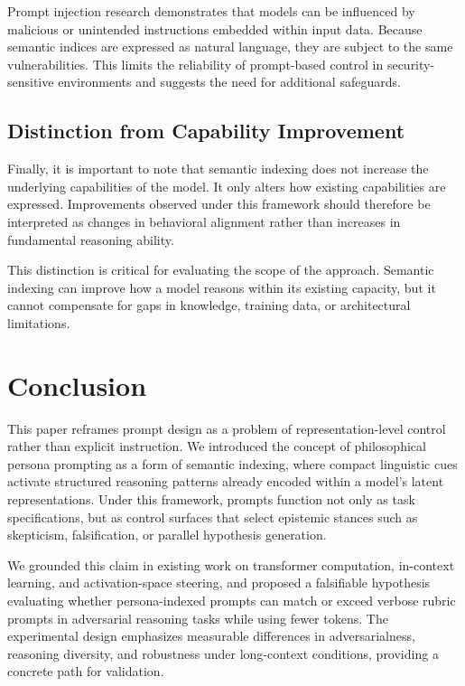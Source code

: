 \documentclass[11pt]{article}
\begin{document}
Prompt injection research demonstrates that models can be influenced by malicious or unintended instructions embedded within input data. Because semantic indices are expressed as natural language, they are subject to the same vulnerabilities. This limits the reliability of prompt-based control in security-sensitive environments and suggests the need for additional safeguards.

\subsection{Distinction from Capability Improvement}

Finally, it is important to note that semantic indexing does not increase the underlying capabilities of the model. It only alters how existing capabilities are expressed. Improvements observed under this framework should therefore be interpreted as changes in behavioral alignment rather than increases in fundamental reasoning ability.

This distinction is critical for evaluating the scope of the approach. Semantic indexing can improve how a model reasons within its existing capacity, but it cannot compensate for gaps in knowledge, training data, or architectural limitations.

\section{Conclusion}

This paper reframes prompt design as a problem of representation-level control rather than explicit instruction. We introduced the concept of philosophical persona prompting as a form of semantic indexing, where compact linguistic cues activate structured reasoning patterns already encoded within a model’s latent representations. Under this framework, prompts function not only as task specifications, but as control surfaces that select epistemic stances such as skepticism, falsification, or parallel hypothesis generation.

We grounded this claim in existing work on transformer computation, in-context learning, and activation-space steering, and proposed a falsifiable hypothesis evaluating whether persona-indexed prompts can match or exceed verbose rubric prompts in adversarial reasoning tasks while using fewer tokens. The experimental design emphasizes measurable differences in adversarialness, reasoning diversity, and robustness under long-context conditions, providing a concrete path for validation.
\end{document}
